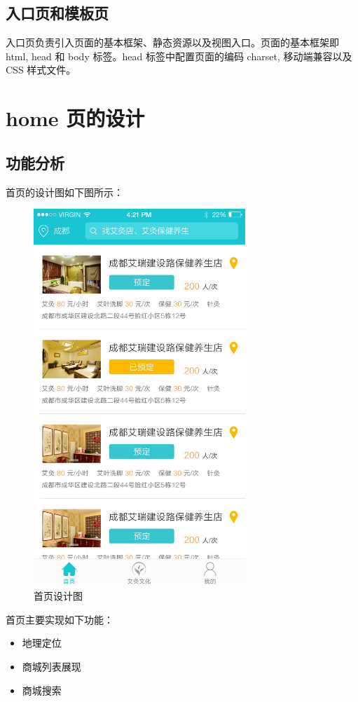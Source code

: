 \documentclass[UTF8]{ctexbook}
\begin{document}
    \subsection{入口页和模板页}
      \label{subsec:入口页和模板页}
      入口页负责引入页面的基本框架、静态资源以及视图入口。页面的基本框架即 html, head 和 body 标签。head 标签中配置页面的编码 charset, 移动端兼容以及 CSS 样式文件。










  \section{home 页的设计}
    \label{sec:home_页的设计}

    \subsection{功能分析}
      \label{subsec:功能分析}
      首页的设计图如下图所示：
      \begin{figure}[H]
        \centering
        \includegraphics[width=8cm]{img/201705181050.jpg}
        \caption{首页设计图}
        \label{fig:home}
      \end{figure}
      首页主要实现如下功能：
      \begin{itemize}
        \item 地理定位
        \item 商城列表展现
        \item 商城搜索
      \end{itemize}
\end{document}

